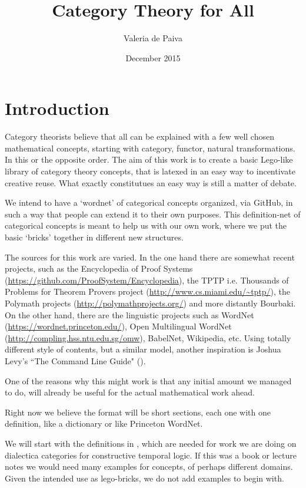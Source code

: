 \documentclass{article}
\title{Category Theory for All}
\author{Valeria de Paiva}
\date{December 2015}
\begin{document}
\maketitle

\section*{Introduction}
Category theorists believe that all can be explained with a few well chosen mathematical concepts, starting with category, 
functor, natural transformations. In this or the opposite order. The aim of this work is to create a basic 
Lego-like library  of category theory concepts, that is latexed in an easy way to incentivate creative reuse. What exactly constitutues an easy way is still a matter of debate.

We intend to have a `wordnet' of categorical concepts organized, via GitHub, in such a way that people can 
extend it to their own purposes. This definition-net of categorical concepts is meant to help us with our 
own work, where we put the basic `bricks' together in different new structures.

The  sources for this work are varied. In the one hand there are somewhat recent projects, such as the  
Encyclopedia of Proof Systems (\url{https://github.com/ProofSystem/Encyclopedia}), 
the TPTP i.e. Thousands of Problems for Theorem Provers project (\url{http://www.cs.miami.edu/~tptp/}),   
the Polymath projects (\url{http://polymathprojects.org/}) and  more distantly Bourbaki. 
On the other hand, there are the linguistic projects such as WordNet (\url{https://wordnet.princeton.edu/}), 
Open Multilingual WordNet (\url{http://compling.hss.ntu.edu.sg/omw}), BabelNet, Wikipedia, etc.  
Using totally  different style of contents, but a similar model, another inspiration is 
Joshua Levy's ``The Command Line Guide" (\url{}).

One of the reasons why this might work is that any initial amount we managed to do, 
will already be useful for the actual mathematical work ahead. 

Right now we believe the format will be short sections, each one  with one definition, like a dictionary or like Princeton WordNet. 

We will start with the definitions in \citep{depaiva1996}, which are needed for work we are doing on 
dialectica categories for constructive temporal logic. If this was a book or lecture notes we would need many examples for concepts,  of perhaps different domains. Given the intended use as lego-bricks, we do not add examples to begin with.
\end{document}
